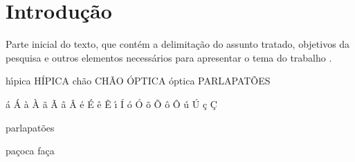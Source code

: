 
\chapter[Introdução]{Introdução}
\label{Introdução}


Parte inicial do texto, que cont\'em a delimitação do assunto tratado, objetivos da pesquisa e outros elementos necess\'arios para apresentar o tema do trabalho \cite{aguia2020}.



h\'{\i}pica
H\'IPICA
ch\~ao
CH\~AO
\'OPTICA
\'optica
PARLAPAT\~OES

\'a
\'A
\`a
\`A
\~a
\~A
\^a
\^A
\'e
\'E
\^e
\^E
\'{\i}
\'I
\'o
\'O
\~o
\~O
\^o
\^O
\'u
\'U
\c{c}
\c{C}

parlapat\~oes


pa\c{c}oca
fa\c{c}a




	
